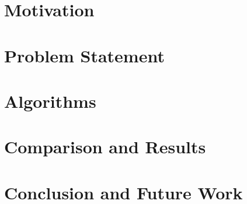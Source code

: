 \documentclass[conference]{IEEEtran}
\begin{document}
\section{Motivation}

\section{Problem Statement}

\section{Algorithms}

\section{Comparison and Results}

\section{Conclusion and Future Work}




\end{document}
